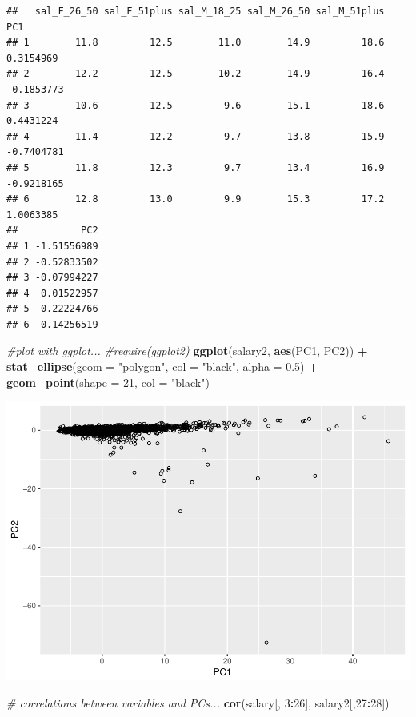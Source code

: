 \documentclass[]{article}
\newenvironment{Shaded}{\begin{snugshade}}{\end{snugshade}}
\newcommand{\KeywordTok}[1]{\textcolor[rgb]{0.13,0.29,0.53}{\textbf{#1}}}
\newcommand{\DataTypeTok}[1]{\textcolor[rgb]{0.13,0.29,0.53}{#1}}
\newcommand{\DecValTok}[1]{\textcolor[rgb]{0.00,0.00,0.81}{#1}}
\newcommand{\FloatTok}[1]{\textcolor[rgb]{0.00,0.00,0.81}{#1}}
\newcommand{\StringTok}[1]{\textcolor[rgb]{0.31,0.60,0.02}{#1}}
\newcommand{\CommentTok}[1]{\textcolor[rgb]{0.56,0.35,0.01}{\textit{#1}}}
\newcommand{\OperatorTok}[1]{\textcolor[rgb]{0.81,0.36,0.00}{\textbf{#1}}}
\newcommand{\NormalTok}[1]{#1}
\begin{document}
\begin{verbatim}
##   sal_F_26_50 sal_F_51plus sal_M_18_25 sal_M_26_50 sal_M_51plus        PC1
## 1        11.8         12.5        11.0        14.9         18.6  0.3154969
## 2        12.2         12.5        10.2        14.9         16.4 -0.1853773
## 3        10.6         12.5         9.6        15.1         18.6  0.4431224
## 4        11.4         12.2         9.7        13.8         15.9 -0.7404781
## 5        11.8         12.3         9.7        13.4         16.9 -0.9218165
## 6        12.8         13.0         9.9        15.3         17.2  1.0063385
##           PC2
## 1 -1.51556989
## 2 -0.52833502
## 3 -0.07994227
## 4  0.01522957
## 5  0.22224766
## 6 -0.14256519
\end{verbatim}

\begin{Shaded}
\begin{Highlighting}[]
\CommentTok{#plot with ggplot...}
\CommentTok{#require(ggplot2)}
\KeywordTok{ggplot}\NormalTok{(salary2, }\KeywordTok{aes}\NormalTok{(PC1, PC2)) }\OperatorTok{+}\StringTok{ }
\StringTok{  }\KeywordTok{stat_ellipse}\NormalTok{(}\DataTypeTok{geom =} \StringTok{"polygon"}\NormalTok{, }\DataTypeTok{col =} \StringTok{"black"}\NormalTok{, }\DataTypeTok{alpha =} \FloatTok{0.5}\NormalTok{) }\OperatorTok{+}\StringTok{ }
\StringTok{  }\KeywordTok{geom_point}\NormalTok{(}\DataTypeTok{shape =} \DecValTok{21}\NormalTok{, }\DataTypeTok{col =} \StringTok{"black"}\NormalTok{)}
\end{Highlighting}
\end{Shaded}

\includegraphics{TSLproject_files/figure-latex/unnamed-chunk-19-3.pdf}

\begin{Shaded}
\begin{Highlighting}[]
\CommentTok{# correlations between variables and PCs...}
\KeywordTok{cor}\NormalTok{(salary[, }\DecValTok{3}\OperatorTok{:}\DecValTok{26}\NormalTok{], salary2[,}\DecValTok{27}\OperatorTok{:}\DecValTok{28}\NormalTok{])}
\end{Highlighting}
\end{Shaded}
\end{document}
